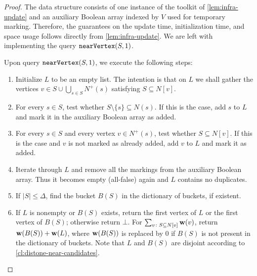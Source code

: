 \begin{proof}
The data structure consists of one instance of the toolkit of \cref{lem:infra-update} and an auxiliary Boolean array indexed by $V$ used for temporary marking. Therefore, the guarantees on the update time, initialization time, and space usage follows directly from \cref{lem:infra-update}. We are left with implementing the query $\mathtt{nearVertex}(S,1)$.



Upon query $\mathtt{nearVertex}(S,1)$, we execute the following steps:
\begin{enumerate}
	\item Initialize $L$ to be an empty list. The intention is that on $L$ we shall gather the vertices $v\in S\cup \bigcup_{s\in S}N^+(s)$ satisfying $S\subseteq N[v]$.
	\item For every $s\in S$, test whether $S\setminus\{s\}\subseteq N(s)$. If this is the case, add $s$ to $L$ and mark it in the auxiliary Boolean array as added.
	\item For every $s\in S$ and every vertex $v\in N^+(s)$, test whether $S\subseteq N[v]$. If this is the case and $v$ is not marked as already added, add $v$ to $L$ and mark it as added.
	\item Iterate through $L$ and remove all the markings from the auxiliary Boolean array. Thus it becomes empty (all-false) again and $L$ contains no duplicates.
	\item If $|S|\le \Delta$, find the bucket $B(S)$ in the dictionary of buckets, if existent.
	\item If $L$ is nonempty or $B(S)$ exists, return the first vertex of $L$ or the first vertex of $B(S)$; otherwise return $\bot$. For $\sum_{v\colon S\subseteq N[v]} \mathbf{w}(v)$, return $\mathbf{w}(B(S))+\mathbf{w}(L)$, where $\mathbf{w}(B(S))$ is replaced by $0$ if $B(S)$ is not present in the dictionary of buckets. Note that $L$ and $B(S)$ are disjoint according to \cref{cl:distone-near-candidates}.

\end{enumerate}
\end{proof}
